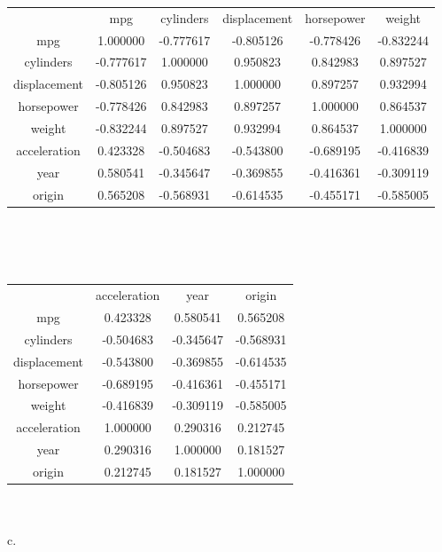 \documentclass[12pt]{article}
\begin{document}
\begin{tabular}{|c|c|c|c|c|c|}
\hline
 &   mpg & cylinders& displacement& horsepower   &  weight\\
mpg       &    1.000000& -0.777617&   -0.805126& -0.778426 & -0.832244\\
cylinders  &  -0.777617&  1.000000 & 0.950823 & 0.842983 & 0.897527\\
displacement& -0.805126&  0.950823 & 1.000000 & 0.897257 & 0.932994\\
horsepower  & -0.778426&  0.842983 & 0.897257 & 1.000000 & 0.864537\\
weight      & -0.832244&  0.897527 & 0.932994&  0.864537 & 1.000000\\
acceleration & 0.423328& -0.504683 & -0.543800& -0.689195 &-0.416839\\
year         & 0.580541& -0.345647 & -0.369855 &-0.416361 &-0.309119\\
origin       & 0.565208& -0.568931 & -0.614535 &-0.455171& -0.585005\\
\hline
\end{tabular}
\\ \\ \\
\begin{tabular}{|c|c|c|c|}
\hline
& acceleration  &     year &    origin \\
mpg       &    0.423328 & 0.580541 & 0.565208\\
cylinders  &  -0.504683 &-0.345647& -0.568931\\
displacement&   -0.543800& -0.369855& -0.614535\\
horsepower  &   -0.689195& -0.416361& -0.455171\\
weight      &  -0.416839& -0.309119& -0.585005\\
acceleration &  1.000000 & 0.290316 & 0.212745\\
year         &   0.290316 & 1.000000 & 0.181527\\
origin       &   0.212745 & 0.181527 & 1.000000\\
\hline
\end{tabular}
\\ \\
c.
\end{document}
